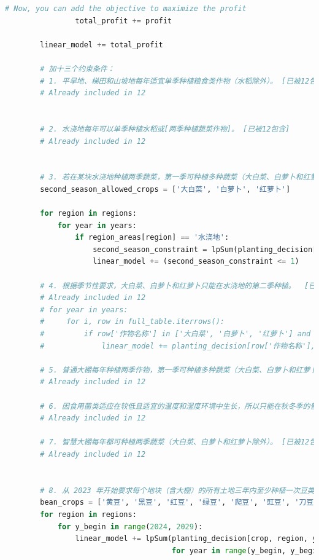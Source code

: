 \documentclass{cumcmthesis}
\begin{document}
\begin{appendices}
\begin{lstlisting}[language=python]
                # Now, you can add the objective to maximize the profit
                total_profit += profit
    
        linear_model += total_profit
    
        # 加十三个约束条件：
        # 1. 平旱地、梯田和山坡地每年适宜单季种植粮食类作物（水稻除外）。 [已被12包含]
        # Already included in 12
    
    
        # 2. 水浇地每年可以单季种植水稻或[两季种植蔬菜作物]。 [已被12包含]
        # Already included in 12
    
    
        # 3. 若在某块水浇地种植两季蔬菜，第一季可种植多种蔬菜（大白菜、白萝卜和红萝卜除外）；第二季只能种植大白菜、白萝卜和红萝卜中的一种（便于管理）。
        second_season_allowed_crops = ['大白菜', '白萝卜', '红萝卜']
    
        for region in regions:
            for year in years:
                if region_areas[region] == '水浇地':
                    second_season_constraint = lpSum(planting_decision[(crop, region, year, '第二季')] for crop in second_season_allowed_crops)
                    linear_model += (second_season_constraint <= 1)
    
        # 4. 根据季节性要求，大白菜、白萝卜和红萝卜只能在水浇地的第二季种植。  [已被12包含]
        # Already included in 12
        # for year in years:
        #     for i, row in full_table.iterrows():
        #         if row['作物名称'] in ['大白菜', '白萝卜', '红萝卜'] and row['地块类型'] == '水浇地':
        #             linear_model += planting_decision[row['作物名称'], row['种植地块'], year, '第一季'] == 0            
    
        # 5. 普通大棚每年种植两季作物，第一季可种植多种蔬菜（大白菜、白萝卜和红萝卜除外），第二季只能种植食用菌。[已被12包含]
        # Already included in 12
    
        # 6. 因食用菌类适应在较低且适宜的温度和湿度环境中生长，所以只能在秋冬季的普通大棚里种植。 [已被12包含]
        # Already included in 12
    
        # 7. 智慧大棚每年都可种植两季蔬菜（大白菜、白萝卜和红萝卜除外）。 [已被12包含]
        # Already included in 12
    
    
        # 8. 从 2023 年开始要求每个地块（含大棚）的所有土地三年内至少种植一次豆类作物。
        bean_crops = ['黄豆', '黑豆', '红豆', '绿豆', '爬豆', '豇豆', '刀豆', '芸豆']
        for region in regions:
            for y_begin in range(2024, 2029):
                linear_model += lpSum(planting_decision[crop, region, year, season] for crop in bean_crops 
                                      for year in range(y_begin, y_begin + 3) for season in seasons) >= 1
    

\end{lstlisting}
\end{appendices}
\end{document}
